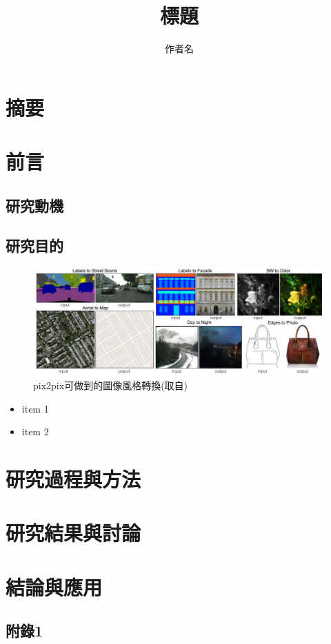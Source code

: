 \documentclass[a4paper, 12pt]{article}
\title{標題}
\author{作者名}
\begin{document}
\tableofcontents
\newpage

\begin{abstract}
\lipsum[1-3]
\end{abstract}
\section*{摘要}
\lipsum[1-3]
\newpage
{}

\section{前言}

\subsection{研究動機}
\lipsum[1-3]

\subsection{研究目的}

\begin{figure}[htbp]
    \centering
    \includegraphics[width=\linewidth]{fig/3.jpg}
    \caption{pix2pix可做到的圖像風格轉換(取自\cite{isola2017image})}
    \label{fig:3}
\end{figure}

\lipsum[1-3]
\begin{itemize}
    \item item 1
    \item item 2
\end{itemize}

\section{研究過程與方法}

\lipsum[1-3]

\section{研究結果與討論}
\lipsum[1-3]

\section{結論與應用}

\lipsum[1-3]

\nocite{*}
\printbibliography[title={參考文獻}]

\newpage
\appendixpage
\begin{appendices}
\section{附錄1}
\lipsum[1-3]

\end{appendices}
\end{document}
